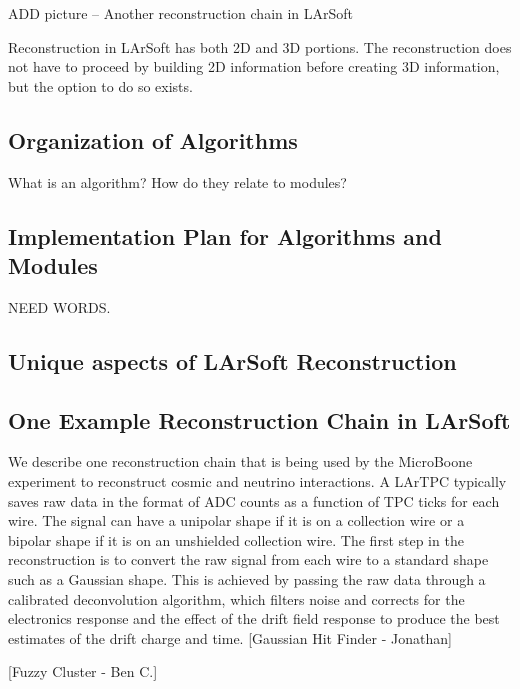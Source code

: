\documentclass[12pt]{elsarticle}
\begin{document}
ADD picture -- Another reconstruction chain in LArSoft

Reconstruction in LArSoft has both 2D and 3D portions. The reconstruction does not have to proceed by building 2D information before creating 3D information, but the option to do so exists. 

\subsection{Organization of Algorithms}

What is an algorithm? How do they relate to modules?

\subsection{Implementation Plan for Algorithms and Modules}
NEED WORDS.

\subsection{Unique aspects of LArSoft Reconstruction}

\subsection{One Example Reconstruction Chain in LArSoft}
We describe one reconstruction chain that is being used by the MicroBoone experiment to reconstruct cosmic and neutrino interactions. A LArTPC typically saves raw data in the format of ADC counts as a function of TPC ticks for each wire. The signal can have a unipolar shape if it is on a collection wire or a bipolar shape if it is on an unshielded collection wire. The first step in the reconstruction is to convert the raw signal from each wire to a standard shape such as a Gaussian shape. This is achieved by passing the raw data through a calibrated deconvolution algorithm, which filters noise and corrects for the electronics response and the effect of the drift field response to produce the best estimates of the drift charge and time. 
[Gaussian Hit Finder - Jonathan]

[Fuzzy Cluster - Ben C.]
\end{document}
